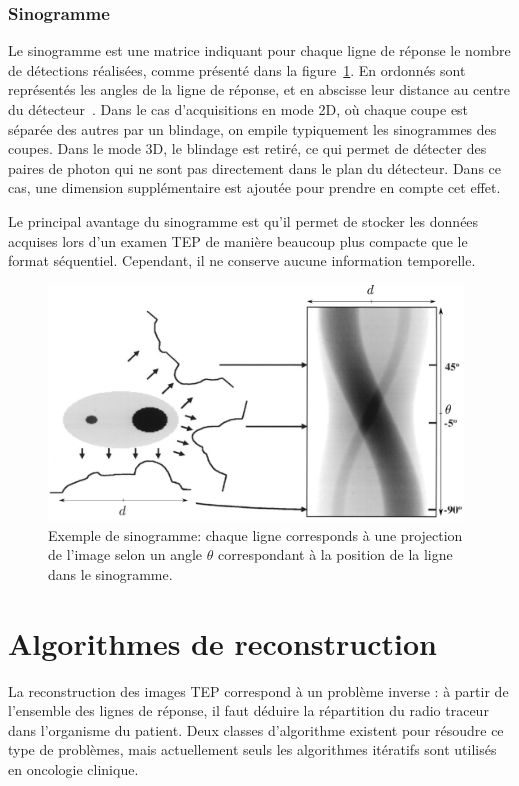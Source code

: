		\subsection{Sinogramme}

Le sinogramme est une matrice indiquant pour chaque ligne de réponse le nombre de détections réalisées, comme présenté dans la figure~\ref{fig:sino}. En ordonnés sont représentés les angles de la ligne de réponse, et en abscisse leur distance au centre du détecteur~\cite{fahey2002data}. Dans le cas d'acquisitions en mode 2D, où chaque coupe est séparée des autres par un blindage, on empile typiquement les sinogrammes des coupes. Dans le mode 3D, le blindage est retiré, ce qui permet de détecter des paires de photon qui ne sont pas directement dans le plan du détecteur. Dans ce cas, une dimension supplémentaire est ajoutée pour prendre en compte cet effet.

Le principal avantage du sinogramme est qu'il permet de stocker les données acquises lors d'un examen TEP de manière beaucoup plus compacte que le format séquentiel. Cependant, il ne conserve aucune information temporelle.

\begin{figure}
\centering
\includegraphics[width=11cm]{images/sino}
\caption[Principe du sinogramme]{Exemple de sinogramme: chaque ligne corresponds à une projection de l'image selon un angle $\theta$ correspondant à la position de la ligne dans le sinogramme.}
\label{fig:sino}
\end{figure}


\chapter{Algorithmes de reconstruction}

La reconstruction des images TEP correspond à un problème inverse : à partir de l'ensemble des lignes de réponse, il faut déduire la répartition du radio traceur dans l'organisme du patient. Deux classes d'algorithme existent pour résoudre ce type de problèmes, mais actuellement seuls les algorithmes itératifs sont utilisés en oncologie clinique. 

